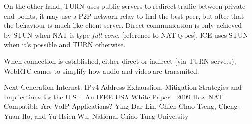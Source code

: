 \documentclass[11pt,twocolumn]{article}
\begin{document}
On the other hand, TURN uses public servers to redirect traffic between private end points, it may use a P2P network relay to find the best peer, but after that the behaviour is much like client-server. Direct communication is only achieved by STUN when NAT is type \textit{full cone}. {\color{red} [reference to NAT types]}. ICE uses STUN when it's possible and TURN otherwise.

When connection is established, either direct or indirect (via TURN servers), WebRTC cames to simplify how audio and video are transmited. 

\begin{thebibliography}{9}


 Next Generation Internet: IPv4 Address Exhaustion, Mitigation Strategies and Implications for the U.S. - An IEEE-USA White Paper - 2009
 How NAT-Compatible Are VoIP Applications? Ying-Dar Lin, Chien-Chao Tseng, Cheng-Yuan Ho, and Yu-Hsien Wu, National Chiao Tung University


\end{thebibliography}
\end{document}

